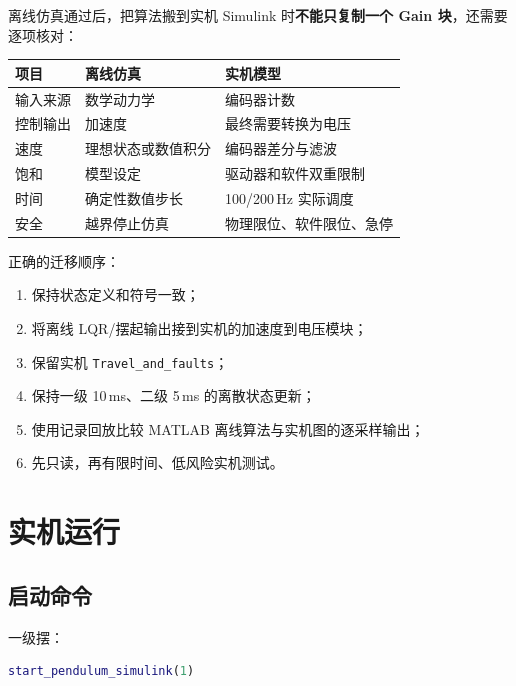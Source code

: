 \documentclass[12pt,a4paper]{article}
\begin{document}
离线仿真通过后，把算法搬到实机 Simulink 时\textbf{不能只复制一个 Gain 块}，还需要逐项核对：

\begin{center}
    \renewcommand{\arraystretch}{1.4}
    \begin{tabular}{@{}l p{5.4cm} p{5.6cm}@{}}
        \toprule
        \textbf{项目} & \textbf{离线仿真} & \textbf{实机模型} \\
        \midrule
        输入来源 & 数学动力学 & 编码器计数 \\
        控制输出 & 加速度 & 最终需要转换为电压 \\
        速度 & 理想状态或数值积分 & 编码器差分与滤波 \\
        饱和 & 模型设定 & 驱动器和软件双重限制 \\
        时间 & 确定性数值步长 & 100/200\,Hz 实际调度 \\
        安全 & 越界停止仿真 & 物理限位、软件限位、急停 \\
        \bottomrule
    \end{tabular}
\end{center}

正确的迁移顺序：

\begin{enumerate}
    \item 保持状态定义和符号一致；
    \item 将离线 LQR/摆起输出接到实机的加速度到电压模块；
    \item 保留实机 \texttt{Travel\_and\_faults}；
    \item 保持一级 10\,ms、二级 5\,ms 的离散状态更新；
    \item 使用记录回放比较 MATLAB 离线算法与实机图的逐采样输出；
    \item 先只读，再有限时间、低风险实机测试。
\end{enumerate}

\section{实机运行}
\label{sec:hardware}

\subsection{启动命令}

一级摆：
\begin{lstlisting}[language=Matlab, caption={一级摆实机启动}, label={lst:run1}]
start_pendulum_simulink(1)
\end{lstlisting}
\end{document}
